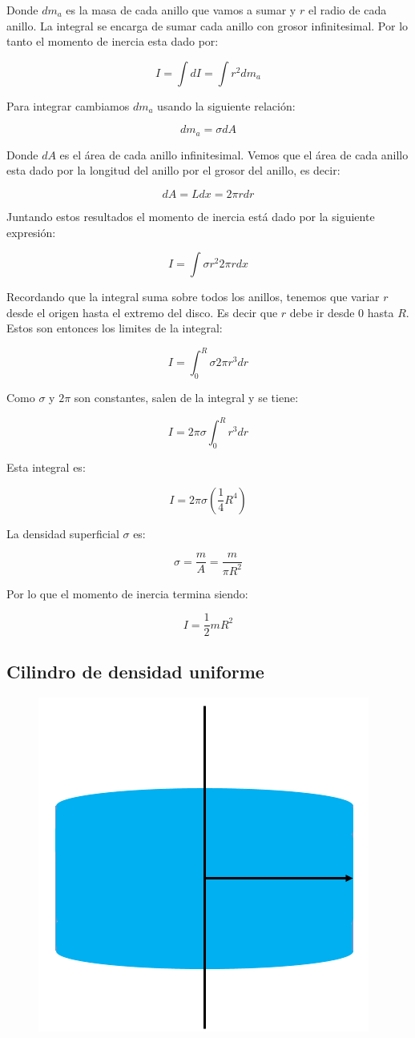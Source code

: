 \documentclass[a4paper,11pt]{article}
\theoremstyle{mytheor}
\begin{document}
Donde $dm_a$ es la masa de cada anillo que vamos a sumar y $r$ el radio de cada anillo. La integral se encarga de sumar cada anillo con grosor infinitesimal. Por lo tanto el momento de inercia esta dado por:


$$ I = \int d I  = \int r^2 dm_a $$

Para integrar cambiamos $dm_a$ usando la siguiente relación:


$$ dm_a = \sigma dA$$

Donde $dA$ es el área de cada anillo infinitesimal. Vemos que el área de cada anillo esta dado por la longitud del anillo por el grosor del anillo, es decir:

$$ dA = L dx = 2 \pi r d r$$

 Juntando estos resultados el momento de inercia está dado por la siguiente expresión:
 
$$ I = \int \sigma r^2 2 \pi r dx$$

Recordando que la integral suma sobre todos los anillos, tenemos que variar $r$ desde el origen hasta el extremo del disco. Es decir que $r$ debe ir desde $0$ hasta $R$. Estos son entonces los limites de la integral:


$$ I =  \int_{0}^{R} \sigma 2\pi   r^3 dr$$

Como $\sigma$ y $2\pi$ son constantes, salen de la integral y se tiene:

$$ I =  2\pi\sigma \int_{0}^{R}    r^3 dr$$

Esta integral es:

$$ I =  2\pi\sigma \left( \frac{1}{4} R^4\right)$$

La densidad superficial $\sigma$ es:

$$ \sigma = \frac{m}{A} = \frac{m}{\pi R^2} $$


Por lo que el momento de inercia termina siendo:

$$ I = \frac{1}{2} m R^2$$


\subsection{Cilindro de densidad uniforme}

\begin{figure}[h]
	\includegraphics[width=0.5\linewidth]{cilindro1}
	\label{fcN4}
\end{figure}
\end{document}
